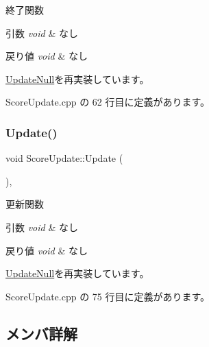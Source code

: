 終了関数 


\begin{DoxyParams}{引数}
{\em void} & なし \\
\hline
\end{DoxyParams}

\begin{DoxyRetVals}{戻り値}
{\em void} & なし \\
\hline
\end{DoxyRetVals}


\mbox{\hyperlink{class_update_null_a5bd107431c5039abe13c966edb047375}{Update\+Null}}を再実装しています。



 Score\+Update.\+cpp の 62 行目に定義があります。

\mbox{\label{class_score_update_aae2b398784079a651ed92eb4c634b1c9}} 
\subsubsection{\texorpdfstring{Update()}{Update()}}
{\footnotesize\ttfamily void Score\+Update\+::\+Update (\begin{DoxyParamCaption}{ }\end{DoxyParamCaption})\hspace{0.3cm}{\ttfamily [override]}, {\ttfamily [virtual]}}



更新関数 


\begin{DoxyParams}{引数}
{\em void} & なし \\
\hline
\end{DoxyParams}

\begin{DoxyRetVals}{戻り値}
{\em void} & なし \\
\hline
\end{DoxyRetVals}


\mbox{\hyperlink{class_update_null_a692f4f34e4ef35ca286a1d3606fdf473}{Update\+Null}}を再実装しています。



 Score\+Update.\+cpp の 75 行目に定義があります。



\subsection{メンバ詳解}
\mbox{\label{class_score_update_ab78fc9ad68faf9f5be01096b5d60959e}} 
